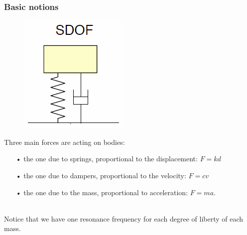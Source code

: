 			\subsubsection{Basic notions}
			\begin{figure}
			\vspace{-5mm}
			\includegraphics[scale=0.5]{ch1/1}
			\end{figure}			
			Three main forces are acting on bodies:
			
			\begin{itemize}
				\item[•] the one due to springs, proportional to the displacement: $F = kd $
				\item[•] the one due to dampers, proportional to the velocity: $F = cv$
				\item[•] the one due to the mass, proportional to acceleration: $F =ma$.
			\end{itemize}
			
			\ \\ Notice that we have one resonance frequency for each degree of liberty of each mass. \newpage
			
